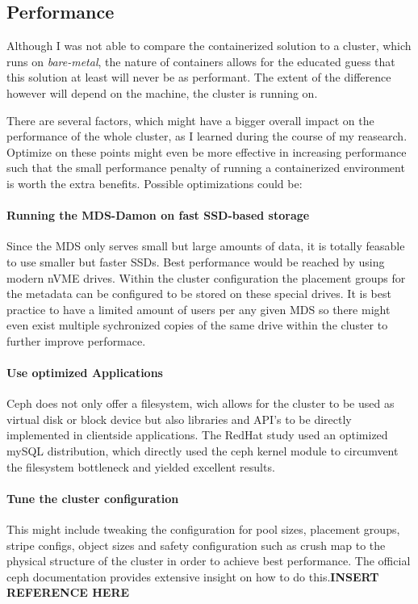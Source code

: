 \documentclass[titlepage, a4paper, 11pt]{scrartcl}
\begin{document}
        \subsection{Performance}\label{performance:tuning}

            Although I was not able to compare the containerized solution to a cluster, which runs on \textit{bare-metal}, 
            the nature of containers allows for the educated guess that this solution at least will never be as performant. The extent of the difference however will depend on the machine, the cluster is running on. 

            There are several factors, which might have a bigger overall impact on the performance of the whole cluster, as I learned during the course of my reasearch. Optimize on these points might even be more effective in increasing performance such that the small performance penalty of running a containerized environment is worth the extra benefits. Possible optimizations could be:

            \paragraph{Running the MDS-Damon on fast SSD-based storage} Since the MDS only serves small but large amounts of data, it is totally feasable to use smaller but faster SSDs. Best performance would be reached by using modern nVME drives. Within the cluster configuration the placement groups for the metadata can be configured to be stored on these special drives. It is best practice to have a limited amount of users per any given MDS so there might even exist multiple sychronized copies of the same drive within the cluster to further improve performace.

            \paragraph{Use optimized Applications} Ceph does not only offer a filesystem, wich allows for the cluster to be used as virtual disk or block device but also libraries and API's to be directly implemented in clientside applications. The RedHat study\cite{redhatstudy} used an optimized mySQL distribution, which directly used the ceph kernel module to circumvent the filesystem bottleneck and yielded excellent results.

            \paragraph{Tune the cluster configuration} This might include tweaking the configuration for pool sizes, placement groups, stripe configs, object sizes and safety configuration such as crush map to the physical structure of the cluster in order to achieve best performance. The official ceph documentation provides extensive insight on how to do this.\textbf{INSERT REFERENCE HERE}
\end{document}
